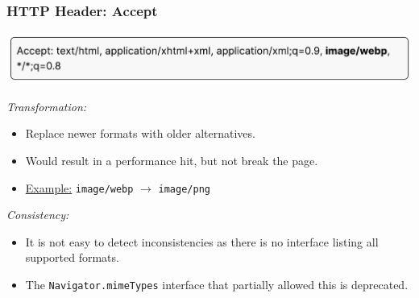 \begin{frame}
	\frametitle{HTTP Header: Accept}
	
	\includegraphics[width=\textwidth]{img/accept.pdf}
	
	\bigskip
	
	\emph{Transformation:}
	
	\begin{itemize}
		\item Replace newer formats with older alternatives.
		\item Would result in a performance hit, but not break the page.
		\item \underline{Example:} \texttt{image/webp} $\rightarrow$ \texttt{image/png}
	\end{itemize}
	
	\medskip
	
	\emph{Consistency:}
	
	\begin{itemize}
		\item It is not easy to detect inconsistencies as there is no interface listing all supported formats.
		\item The \texttt{Navigator.mimeTypes} interface that partially allowed this is deprecated.
	\end{itemize}
\end{frame}

